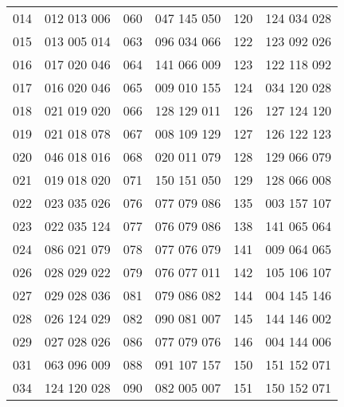 \documentclass[12pt,fleqn]{article}
\begin{document}
\begin{table}[h]
\begin{center}
\begin{tabular}{|c|c|c|c|c|c|}
         014 &            012 013 006  &         060 &            047 145 050  &         120 &            124 034 028  \\
        015 &            013 005 014  &         063 &            096 034 066  &         122 &            123 092 026  \\
         016 &            017 020 046  &         064 &            141 066 009  &         123 &            122 118 092  \\
        017 &            016 020 046  &         065 &            009 010 155  &         124 &            034 120 028  \\
         018 &            021 019 020  &         066 &            128 129 011  &         126 &            127 124 120  \\
         019 &            021 018 078  &         067 &            008 109 129  &         127 &            126 122 123  \\
        020 &            046 018 016  &         068 &            020 011 079  &         128 &            129 066 079  \\
        021 &            019 018 020  &         071 &            150 151 050  &         129 &            128 066 008  \\
        022 &            023 035 026  &         076 &            077 079 086  &         135 &            003 157 107  \\
         023 &            022 035 124  &         077 &            076 079 086  &         138 &            141 065 064  \\
         024 &            086 021 079  &         078 &            077 076 079  &         141 &            009 064 065  \\
        026 &            028 029 022  &         079 &            076 077 011  &         142 &            105 106 107  \\
         027 &            029 028 036  &         081 &            079 086 082  &         144 &            004 145 146  \\
         028 &            026 124 029  &         082 &            090 081 007  &         145 &            144 146 002  \\
         029 &            027 028 026  &         086 &            077 079 076  &         146 &            004 144 006  \\
         031 &            063 096 009  &         088 &            091 107 157  &         150 &            151 152 071  \\
         034 &            124 120 028  &         090 &            082 005 007  &         151 &            150 152 071  \\

\end{tabular}
\end{center}
\end{table}
\end{document}
